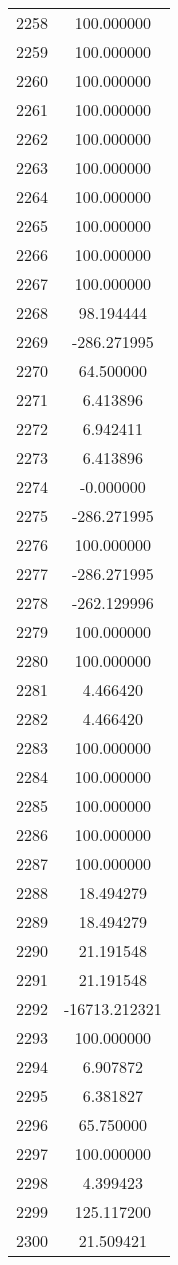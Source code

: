 \documentclass[12pt]{article}
\begin{document}
\begin{longtable}{@{}cc@{}}
2258 & 100.000000 \\
2259 & 100.000000 \\
2260 & 100.000000 \\
2261 & 100.000000 \\
2262 & 100.000000 \\
2263 & 100.000000 \\
2264 & 100.000000 \\
2265 & 100.000000 \\
2266 & 100.000000 \\
2267 & 100.000000 \\
2268 & 98.194444 \\
2269 & -286.271995 \\
2270 & 64.500000 \\
2271 & 6.413896 \\
2272 & 6.942411 \\
2273 & 6.413896 \\
2274 & -0.000000 \\
2275 & -286.271995 \\
2276 & 100.000000 \\
2277 & -286.271995 \\
2278 & -262.129996 \\
2279 & 100.000000 \\
2280 & 100.000000 \\
2281 & 4.466420 \\
2282 & 4.466420 \\
2283 & 100.000000 \\
2284 & 100.000000 \\
2285 & 100.000000 \\
2286 & 100.000000 \\
2287 & 100.000000 \\
2288 & 18.494279 \\
2289 & 18.494279 \\
2290 & 21.191548 \\
2291 & 21.191548 \\
2292 & -16713.212321 \\
2293 & 100.000000 \\
2294 & 6.907872 \\
2295 & 6.381827 \\
2296 & 65.750000 \\
2297 & 100.000000 \\
2298 & 4.399423 \\
2299 & 125.117200 \\
2300 & 21.509421 \\

\end{longtable}
\end{document}
